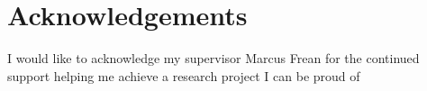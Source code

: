 \chapter*{Acknowledgements}
\thispagestyle{empty}

I would like to acknowledge my supervisor Marcus Frean for the continued support helping me achieve a research project I can be proud of

